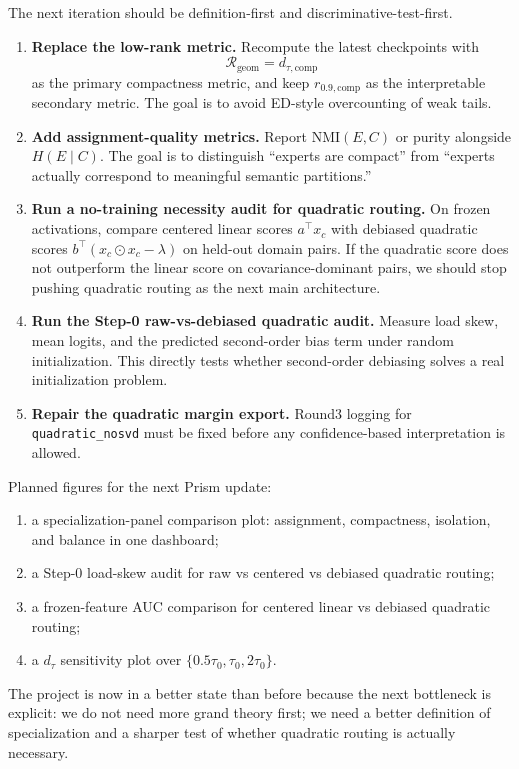 \documentclass[11pt]{article}
\begin{document}
The next iteration should be definition-first and discriminative-test-first.

\begin{enumerate}
    \item \textbf{Replace the low-rank metric.} Recompute the latest checkpoints with
    \[
    \mathcal{R}_{\mathrm{geom}} = d_{\tau,\mathrm{comp}}
    \]
    as the primary compactness metric, and keep $r_{0.9,\mathrm{comp}}$ as the interpretable secondary metric. The goal is to avoid ED-style overcounting of weak tails.

    \item \textbf{Add assignment-quality metrics.} Report NMI$(E,C)$ or purity alongside $H(E\mid C)$. The goal is to distinguish ``experts are compact'' from ``experts actually correspond to meaningful semantic partitions.''

    \item \textbf{Run a no-training necessity audit for quadratic routing.} On frozen activations, compare centered linear scores $a^\top x_c$ with debiased quadratic scores $b^\top(x_c\odot x_c-\lambda)$ on held-out domain pairs. If the quadratic score does not outperform the linear score on covariance-dominant pairs, we should stop pushing quadratic routing as the next main architecture.

    \item \textbf{Run the Step-0 raw-vs-debiased quadratic audit.} Measure load skew, mean logits, and the predicted second-order bias term under random initialization. This directly tests whether second-order debiasing solves a real initialization problem.

    \item \textbf{Repair the quadratic margin export.} Round3 logging for \texttt{quadratic\_nosvd} must be fixed before any confidence-based interpretation is allowed.
\end{enumerate}

Planned figures for the next Prism update:
\begin{enumerate}
    \item a specialization-panel comparison plot: assignment, compactness, isolation, and balance in one dashboard;
    \item a Step-0 load-skew audit for raw vs centered vs debiased quadratic routing;
    \item a frozen-feature AUC comparison for centered linear vs debiased quadratic routing;
    \item a $d_\tau$ sensitivity plot over $\{0.5\tau_0,\tau_0,2\tau_0\}$.
\end{enumerate}

The project is now in a better state than before because the next bottleneck is explicit: we do not need more grand theory first; we need a better definition of specialization and a sharper test of whether quadratic routing is actually necessary.
\end{document}

